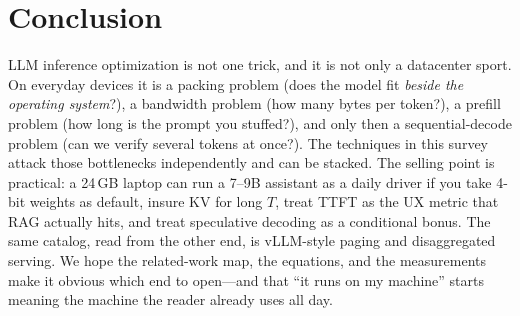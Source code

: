 \section{Conclusion}
\label{sec:conclusion}

LLM inference optimization is not one trick, and it is not only a datacenter sport. On everyday devices it is a packing problem (does the model fit \emph{beside the operating system}?), a bandwidth problem (how many bytes per token?), a prefill problem (how long is the prompt you stuffed?), and only then a sequential-decode problem (can we verify several tokens at once?). The techniques in this survey attack those bottlenecks independently and can be stacked. The selling point is practical: a 24\,GB laptop can run a 7--9B assistant as a daily driver if you take 4-bit weights as default, insure KV for long \(T\), treat TTFT as the UX metric that RAG actually hits, and treat speculative decoding as a conditional bonus. The same catalog, read from the other end, is vLLM-style paging and disaggregated serving. We hope the related-work map, the equations, and the measurements make it obvious which end to open---and that ``it runs on my machine'' starts meaning the machine the reader already uses all day.
